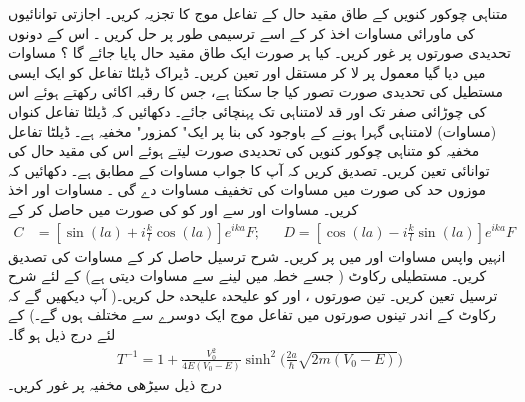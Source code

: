  
متناہی چوکور کنویں  کے طاق مقید حال کے تفاعل موج کا تجزیہ کریں۔ اجازتی توانائیوں کی ماورائی مساوات اخذ کر کے اسے ترسیمی طور پر حل کریں ۔ اس کے دونوں تحدیدی صورتوں پر غور کریں۔ کیا ہر صورت ایک طاق مقید حال پایا جائے گا ؟ 
 مساوات میں دیا گیا  معمول پر لا کر مستقل اور تعین کریں۔
ڈیراک ڈیلٹا تفاعل کو ایک ایسی مستطیل کی تحدیدی صورت تصور کیا جا سکتا ہے، جس کا رقبہ اکائی  رکھتے ہوئے اس کی چوڑائی صفر تک اور قد لامتناہی تک پہنچائی جائے۔ دکھائیں کہ ڈیلٹا تفاعل کنواں (مساوات) لامتناہی گہرا ہونے کے باوجود کی بنا پر ایک" کمزور" مخفیہ ہے۔ ڈیلٹا تفاعل مخفیہ کو متناہی چوکور کنویں  کی تحدیدی صورت لیتے ہوئے اس کی مقید حال کی توانائی تعین کریں۔ تصدیق کریں کہ آپ کا جواب مساوات کے مطابق ہے۔ دکھائیں کہ موزوں حد کی صورت میں مساوات کی تخفیف مساوات دے گی ۔
مساوات  اور  اخذ کریں۔ مساوات  اور سے  اور  کو  کی صورت میں حاصل کر کے
\begin{align*}
C&=[\sin(la)+i\frac{k}{l}\cos(la)]e^{ika}F; && D=[\cos(la)-i\frac{k}{l}\sin(la)]e^{ika}F
 \end{align*}
 انہیں واپس مساوات  اور  میں پر کریں۔ شرح ترسیل حاصل کر کے مساوات کی تصدیق کریں۔
مستطیلی رکاوٹ ( جسے خطہ میں لینے سے مساوات  دیتی ہے) کے لئے شرح ترسیل تعین کریں۔ تین صورتوں  ،
اور  کو علیحدہ علیحدہ حل کریں۔( آپ دیکھیں گے کہ رکاوٹ کے اندر تینوں صورتوں میں تفاعل موج ایک دوسرے سے مختلف ہوں گے۔)   کے لئے درج ذیل ہو گا۔
\begin{align*}
T^{-1}=1+\frac{V_{0}^2}{4E(V_{0}-E)}\sinh^{2}\Big(\frac{2a}{\hslash}\sqrt{2m(V_{0}-E)} \Big) 
\end{align*}
 درج ذیل سیڑھی مخفیہ پر غور کریں۔
